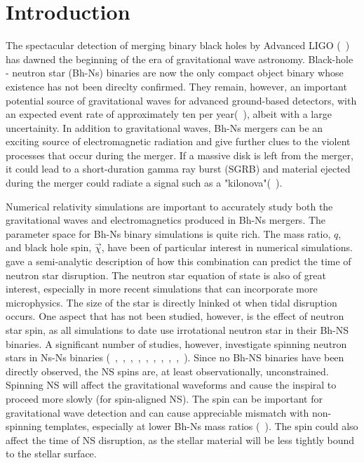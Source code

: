 

\section{Introduction}

The spectacular detection of merging binary black holes by Advanced LIGO (~\cite{Abbott:2016blz}) has dawned the beginning of the era of gravitational wave astronomy. Black-hole - neutron star (Bh-Ns) binaries are now the only compact object binary whose existence has not been direclty confirmed. They remain, however, an important potential source of gravitational waves for advanced ground-based detectors, with an expected event rate of approximately ten per year(~\cite{AbadieLSC:2010}), albeit with a large uncertainity. In addition to gravitational waves, Bh-Ns mergers can be an exciting source of electromagnetic radiation and give further clues to the violent processes that occur during the merger. If a massive disk is left from the merger, it could lead to a short-duration gamma ray burst (SGRB) and material ejected during the merger could radiate a signal such as a "kilonova"(~\cite{metzger:11}).

Numerical relativity simulations are important to accurately study both the gravitational waves and electromagnetics produced in Bh-Ns mergers. The parameter space for Bh-Ns binary simulations is quite rich. The mass ratio, $q$, and black hole spin, $\vec{\chi}$, have been of particular interest in numerical simulations. 
\cite{Foucart2012} gave a semi-analytic description of how this combination can predict the time of neutron star disruption. The neutron star equation of state is also of great interest, especially in more recent simulations that can incorporate more microphysics. The size of the star is directly lninked ot when tidal disruption occurs. One aspect that has not been studied, however, is the effect of neutron star spin, as all simulations to date use irrotational neutron star in their Bh-NS binaries. A significant number of studies, however, investigate spinning neutron stars in Ns-Ns binaries (~\cite{Baumgarte:2009fw},~\cite{Tichy:2011gw},~\cite{East:2012zn},~\cite{Tichy:2012rp},~\cite{Bernuzzi:2013rza},~\cite{Kastaun:2013mv},~\cite{Tsatsin:2013jca},~\cite{Dietrich:2015pxa},~\cite{East:2015yea},~\cite{Tsokaros:2015fea}). Since no Bh-NS binaries have been directly observed, the NS spins are, at least observationally, unconstrained. Spinning NS will affect the gravitational waveforms and cause the inspiral to proceed more slowly (for spin-aligned NS). The spin can be important for gravitational wave detection and can cause appreciable mismatch with non-spinning templates, especially at lower Bh-Ns mass ratios (~\cite{Ajith:2011ec}). The spin could also affect the time of NS disruption, as the stellar material will be less tightly bound to the stellar surface.

